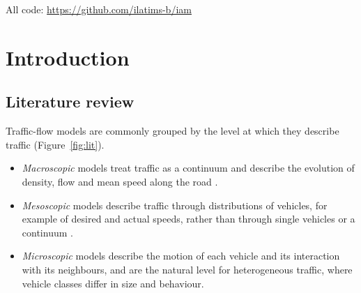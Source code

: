 \documentclass[11pt]{article}
\begin{document}
\begin{center}\small
All code: \url{https://github.com/ilatims-b/iam}
\end{center}

\tableofcontents
\newpage

\section{Introduction}
\label{sec:intro}

\subsection{Literature review}
\label{sec:lit}
Traffic-flow models are commonly grouped by the level at which they describe
traffic (Figure~\ref{fig:lit}).
\begin{itemize}\setlength{\itemsep}{1pt}
\item \emph{Macroscopic} models treat traffic as a continuum and describe the
evolution of density, flow and mean speed along the road \cite{lw55,richards56}.
\item \emph{Mesoscopic} models describe traffic through distributions of
vehicles, for example of desired and actual speeds, rather than through single
vehicles or a continuum \cite{ph71}.
\item \emph{Microscopic} models describe the motion of each vehicle and its
interaction with its neighbours, and are the natural level for heterogeneous
traffic, where vehicle classes differ in size and behaviour.
\end{itemize}
\end{document}
